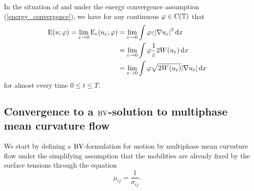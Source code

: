 \begin{lemma}
	\label{equipartition_of_energies_multiphase}
	In the situation of  and under the energy convergence assumption (\ref{energy_convergence}), we have for any continuous $ \varphi \in \operatorname{C} ( \operatorname{\mathbb{T}} ) $ that
	\begin{align*}
		\operatorname{E} ( u ; \varphi )
		=
		\lim_{ \varepsilon \to 0 }
			\operatorname{E}_{ \varepsilon } ( u_{ \varepsilon } ; \varphi )
		& =
		\lim_{ \varepsilon \to 0 }
			\int
				\varphi
				\varepsilon
				\abs{ \nabla u_{ \varepsilon } }^{ 2 }
			\dd{ x }
		\\
		& =
		\lim_{ \varepsilon \to 0 }
			\int
				\varphi
				\frac{ 1 }{ \varepsilon } 2 W ( u_{ \varepsilon } )
			\dd{ x }
		\\
		& =
		\lim_{ \varepsilon \to 0 }
			\int
				\varphi
				\sqrt{ 2 W ( u_{ \varepsilon } ) }
				\abs{ \nabla u_{ \varepsilon } }
			\dd{ x }
	\end{align*}
	for almost every time $ 0 \leq t \leq T $.
\end{lemma}

\subsection{Convergence to a $\operatorname{BV}$-solution to multiphase mean curvature flow}

We start by defining a $ \operatorname{BV} $-formulation for motion by multiphase mean curvature flow under the simplifying assumption that the mobilities are already fixed by the surface tensions through the equation
\begin{equation}
	\label{mobilites_inverse_of_surface_tensions}
	\mu_{ i j } =\frac{ 1 }{ \sigma_{ i j } }. 
\end{equation}

